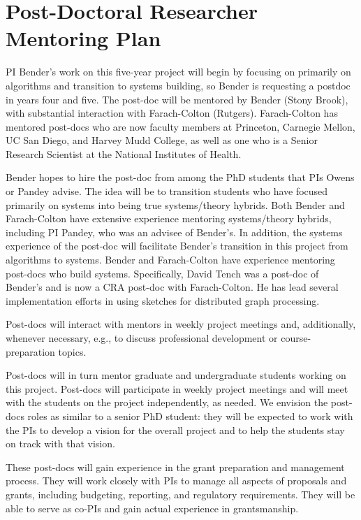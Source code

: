 
\section*{Post-Doctoral Researcher Mentoring Plan}
\label{postdoc}



PI Bender's work on this five-year project will begin by focusing on primarily on algorithms and
transition to systems building, so Bender is requesting a postdoc in years four and five. The post-doc will be mentored by Bender (Stony Brook),
with substantial interaction with Farach-Colton (Rutgers).  Farach-Colton has
mentored post-docs who are now faculty members at Princeton, Carnegie
Mellon, UC San Diego, and Harvey Mudd College, as well as one who is a
Senior Research Scientist at the National Institutes of Health.

Bender hopes to hire the post-doc from among the PhD students that PIs Owens or Pandey advise.  The idea will be to transition students who have focused primarily on systems into being true systems/theory hybrids.  Both Bender and Farach-Colton have extensive experience mentoring systems/theory hybrids, including PI Pandey, who was an advisee of Bender's.  In addition, the systems experience of the post-doc will facilitate Bender's transition in this project from algorithms to systems.  Bender and Farach-Colton have experience mentoring post-docs who build systems.  Specifically, David Tench was a post-doc of Bender's and is now a CRA post-doc with Farach-Colton.  He has lead several implementation efforts in using sketches for distributed graph processing. 

Post-docs will interact with mentors in weekly project meetings
and, additionally,  whenever  necessary, e.g., to discuss professional development or course-preparation topics.

Post-docs will in turn mentor graduate and undergraduate students
working on this project.  Post-docs will participate in weekly project
meetings and will meet with the students on the project independently,
as needed.  We envision the post-docs roles as similar to a senior PhD
student: they will be expected to work with the PIs to develop a
vision for the overall project and to help the students stay on track
with that vision. 

These post-docs will gain experience in the grant preparation and
management process.  They will work closely with PIs to manage all
aspects of proposals and grants, including budgeting, reporting, and
regulatory requirements. They will be able to serve as co-PIs and
gain actual experience in grantsmanship.

